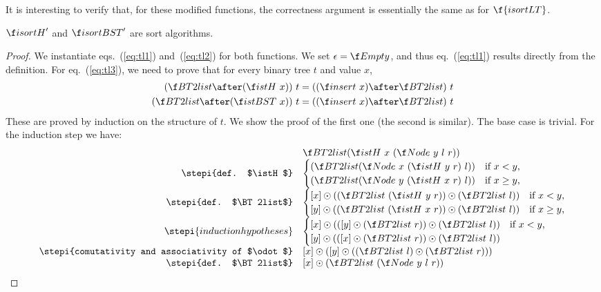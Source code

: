 \documentclass[a4paper,11pt]{llncs}
\begin{document}
It is interesting to verify that, for these modified functions, the
correctness argument is essentially the same as for $\f{isortLT}$.

\begin{proposition}
  $\isortH'$ and $\isortBST'$ are sort algorithms.
\end{proposition}
\begin{proof}
  We instantiate eqs.~(\ref{eq:tl1}) and~(\ref{eq:tl2}) for both
  functions. We set $\epsilon = \Empty$, and thus eq.~(\ref{eq:tl1})
  results directly from the definition. For eq.~(\ref{eq:tl3}), we
  need to prove that for every binary tree $t$ and value $x$,
\begin{align*}
(\BT2list \after (\istH\ x))\ t & = ((\insert\ x)
  \after \BT2list)\ t \\
(\BT2list \after (\istBST\ x))\ t & = ((\insert\ x)
  \after \BT2list)\ t \\
\end{align*}
These are proved by induction on the structure of $t$. We show the
proof of the first one (the second is similar). The base case is
trivial. For the induction step we have:
\[
  \begin{array}{rl}
    & \BT2list(\istH\ x\ (\Node\ y\ l\ r)) \\
    \stepi{def. $\istH$}
    & 
    \begin{cases}
      (\BT2list(\Node\ x\ (\istH\ y\ r)\ l))
      & \text{if $x<y$,}\\
      (\BT2list(\Node\ y\ (\istH\ x\ r)\ l))
      & \text{if $x\geq y$,}\\
    \end{cases} \\
    \stepi{def. $\BT2list$}
    & 
    \begin{cases}
      [x]\odot ((\BT2list\ (\istH\ y\ r))\odot(\BT2list\ l))
      & \text{if $x<y$,}\\
      [y]\odot ((\BT2list\ (\istH\ x\ r))\odot(\BT2list\ l))
      & \text{if $x\geq y$,}\\
    \end{cases} \\
    \stepi{induction hypotheses}
    & 
    \begin{cases}
      [x]\odot (([y]\odot(\BT2list\ r))\odot(\BT2list\ l))
      & \text{if $x<y$,}\\
      [y]\odot (([x]\odot(\BT2list\ r))\odot(\BT2list\ l))
    \end{cases} \\
    \stepi{comutativity and associativity of $\odot$}
    & 
    [x]\odot ([y]\odot((\BT2list\ l)\odot(\BT2list\ r))) \\
    \stepi{def. $\BT2list$}
    & 
    [x]\odot (\BT2list\ (\Node\ y\ l\ r))
  \end{array}
\]
\end{proof}
\end{document}
